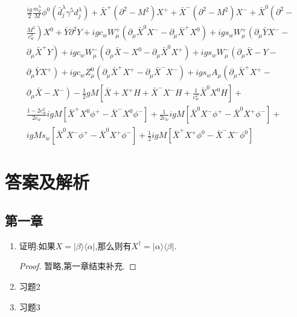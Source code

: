 \documentclass[lang=cn,newtx,10pt,scheme=chinese,thmcnt=section]{elegantbook}
\begin{document}
\begin{equation}
\begin{aligned}
		&\frac{i g}{2} \frac{m_{d}^{\lambda}}{M} \phi^{0}\left(\bar{d}_{j}^{\lambda} \gamma^{5} d_{j}^{\lambda}\right)+\bar{X}^{+}\left(\partial^{2}-M^{2}\right) X^{+}+\bar{X}^{-}\left(\partial^{2}-M^{2}\right) X^{-}+\bar{X}^{0}\left(\partial^{2}-\right.\\
		&\left.\frac{M^{2}}{c_{w}^{2}}\right) X^{0}+\bar{Y} \partial^{2} Y+i g c_{w} W_{\mu}^{+}\left(\partial_{\mu} \bar{X}^{0} X^{-}-\partial_{\mu} \bar{X}^{+} X^{0}\right)+i g s_{w} W_{\mu}^{+}\left(\partial_{\mu} \bar{Y} X^{-}-\right.\\
		&\left.\partial_{\mu} \bar{X}^{+} Y\right)+i g c_{w} W_{\mu}^{-}\left(\partial_{\mu} \bar{X}-X^{0}-\partial_{\mu} \bar{X}^{0} X^{+}\right)+i g s_{w} W_{\mu}^{-}\left(\partial_{\mu} \bar{X}-Y-\right.\\
		&\left.\partial_{\mu} \bar{Y} X^{+}\right)+i g c_{w} Z_{\mu}^{0}\left(\partial_{\mu} \bar{X}^{+} X^{+}-\partial_{\mu} \bar{X}^{-} X^{-}\right)+i g s_{w} A_{\mu}\left(\partial_{\mu} \bar{X}^{+} X^{+}-\right.\\
		&\left.\partial_{\mu} \bar{X}-X^{-}\right)-\frac{1}{2} g M\left[\bar{X}+X^{+} H+\bar{X}^{-} X^{-} H+\frac{1}{c_{w}^{2}} \bar{X}^{0} X^{0} H\right]+\\
		&\frac{1-2 c_{w}^{2}}{2 c_{w}} i g M\left[\bar{X}^{+} X^{0} \phi^{+}-\bar{X}^{-} X^{0} \phi^{-}\right]+\frac{1}{2 c_{w}} i g M\left[\bar{X}^{0} X^{-} \phi^{+}-\bar{X}^{0} X^{+} \phi^{-}\right]+\\
		&ig M s_{w}\left[\bar{X}^{0} X^{-} \phi^{+}-\bar{X}^{0} X^{+} \phi^{-}\right]+\frac{1}{2} i g M\left[\bar{X}^{+} X^{+} \phi^{0}-\bar{X}^{-} X^{-} \phi^{0}\right]
	\end{aligned}
\end{equation}
\chapter{答案及解析}
\section{第一章}
\begin{enumerate}
	\item 证明:如果$X=|\beta\rangle\langle\alpha|$,那么则有$X^\dagger=|\alpha\rangle\langle\beta|$.
	\begin{proof}
		暂略,第一章结束补充.
	\end{proof}
	\item 习题2
	\item 习题3
\end{enumerate}
\end{document}
